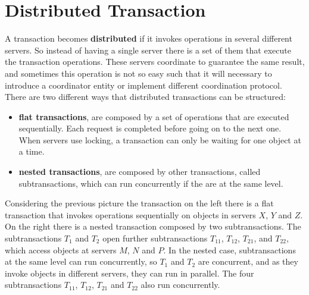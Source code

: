 \section{Distributed Transaction}
A transaction becomes \textbf{distributed} if it invokes operations in several different
servers. So instead of having a single server there is a set of them that execute the transaction operations. These servers coordinate to guarantee the same result, and sometimes this operation is not so easy such that it will necessary to introduce a coordinator entity or implement different coordination protocol. There are two different ways that distributed transactions can be structured:
\begin{itemize}
	\item \textbf{flat transactions}, are composed by a set of operations that are executed sequentially. Each request is completed before going on to the next one. When servers use locking, a transaction can only be waiting for one object at a time.
	
	\item \textbf{nested transactions}, are composed by other transactions, called subtransactions, which can run concurrently if the are at the same level.
	
\end{itemize}
Considering the previous picture the transaction on the left there is a flat transaction that invokes operations sequentially on objects in servers $X$, $Y$ and $Z$. 
On the right there is a nested transaction composed by two subtransactions. The subtransactions $T_1$ and $T_2$ open further subtransactions $T_{11}$, $T_{12}$, $T_{21}$, and $T_{22}$, which access objects at servers $M$, $N$ and $P$. In the nested case, subtransactions at the same level can run concurrently, so $T_1$ and $T_2$ are concurrent, and as they invoke objects in different servers, they can run in parallel. The four subtransactions  $T_{11}$,  $T_{12}$, $T_{21}$ and $T_{22}$ also run concurrently.




